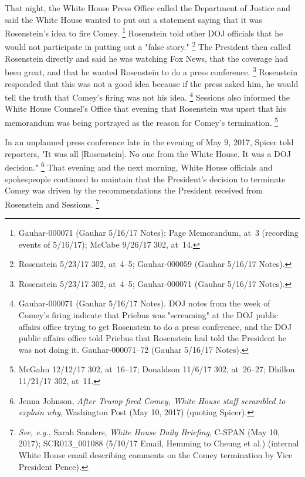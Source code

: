 {That night, the White House Press Office called the Department of Justice and said the White House wanted to put out a statement saying that it was Rosenstein's idea to fire Comey.%
\footnote{Gauhar-000071 (Gauhar 5/16/17 Notes);
Page Memorandum, at~3 (recording events of 5/16/17);
McCabe 9/26/17 302, at~14.}
Rosenstein told other DOJ officials that he would not participate in putting out a "false story."%
\footnote{Rosenstein 5/23/17 302, at~4--5;
Gauhar-000059 (Gauhar 5/16/17 Notes).}
The President then called Rosenstein directly and said he was watching Fox News, that the coverage had been great, and that he wanted Rosenstein to do a press conference.%
\footnote{Rosenstein 5/23/17 302, at~4--5;
Gauhar-000071 (Gauhar 5/16/17 Notes).}
Rosenstein responded that this was not a good idea because if the press asked him, he would tell the truth that Comey's firing was not his idea.%
\footnote{Gauhar-000071 (Gauhar 5/16/17 Notes).
DOJ notes from the week of Comey's firing indicate that Priebus was "screaming" at the DOJ public affairs office trying to get Rosenstein to do a press conference, and the DOJ public affairs office told Priebus that Rosenstein had told the President he was not doing it.
Gauhar-000071--72 (Gauhar 5/16/17 Notes).}
Sessions also informed the White House Counsel's Office that evening that Rosenstein was upset that his memorandum was being portrayed as the reason for Comey's termination.%
\footnote{McGahn 12/12/17 302, at~16--17;
Donaldson 11/6/17 302, at~26--27;
Dhillon 11/21/17 302, at~11.}

In an unplanned press conference late in the evening of May 9, 2017, Spicer told reporters, "It was all [Rosenstein].
No one from the White House.
It was a DOJ decision."%
\footnote{Jenna Johnson, \textit{After Trump fired Comey, White House staff scrambled to explain why}, Washington Post (May 10, 2017) (quoting Spicer).}
That evening and the next morning, White House officials and spokespeople continued to maintain that the President's decision to terminate Comey was driven by the recommendations the President received from Rosenstein and Sessions.%
\footnote{\textit{See, e.g.}, Sarah Sanders, \textit{White House Daily Briefing}, C-SPAN (May 10, 2017);
SCR013\_001088 (5/10/17 Email, Hemming to Cheung et al.) (internal White House email describing comments on the Comey termination by Vice President Pence).}

}
